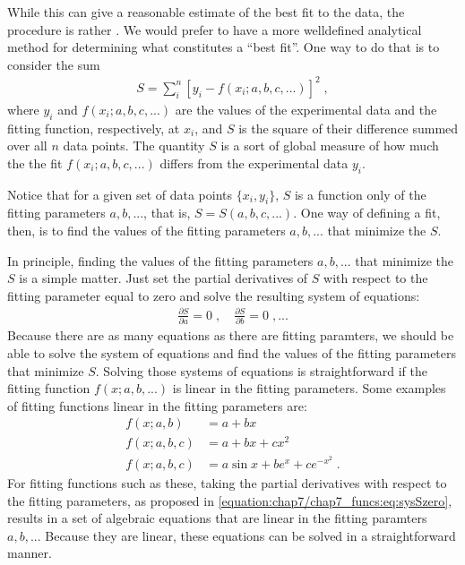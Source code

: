 \documentclass[letterpaper,10pt,english]{sphinxmanual}
\begin{document}
\sphinxAtStartPar
While this can give a reasonable estimate of the best fit to the data, the procedure is rather .  We would prefer to have a more well\sphinxhyphen{}defined analytical method for determining what constitutes a “best fit”.  One way to do that is to consider the sum
\begin{equation}\label{equation:chap7/chap7_funcs:eq:lsqrsum}
\begin{split}S = \sum_{i}^{n} [y_{i} - f(x_{i}; a, b, c, ...)]^2 \;,\end{split}
\end{equation}
\sphinxAtStartPar
where \(y_{i}\) and \(f(x_{i}; a, b, c, ...)\) are the values of the experimental data and the fitting function, respectively, at \(x_{i}\), and \(S\) is the square of their difference summed over all \(n\) data points.  The quantity \(S\) is a sort of global measure of how much the the fit \(f(x_{i}; a, b, c, ...)\) differs from the experimental data \(y_{i}\).

\sphinxAtStartPar
Notice that for a given set of data points \(\{x_i, y_i\}\), \(S\) is a function only of the fitting parameters \(a, b, ...\), that is, \(S=S(a, b, c, ...)\).  One way of defining a  fit, then, is to find the values of the fitting parameters \(a, b, ...\) that minimize the \(S\).

\sphinxAtStartPar
In principle, finding the values of the fitting parameters \(a, b, ...\) that minimize the \(S\) is a simple matter.  Just set the partial derivatives of \(S\) with respect to the fitting parameter equal to zero and solve the resulting system of equations:
\begin{equation}\label{equation:chap7/chap7_funcs:eq:sysSzero}
\begin{split}\frac{\partial S}{\partial a} = 0 \;, \quad
\frac{\partial S}{\partial b} = 0 \;, ...\end{split}
\end{equation}
\sphinxAtStartPar
Because there are as many equations as there are fitting paramters, we should be able to solve the system of equations and find the values of the fitting parameters that minimize \(S\).  Solving those systems of equations is straightforward if the fitting function \(f(x; a, b, ...)\) is linear in the fitting parameters.  Some examples of fitting functions linear in the fitting parameters are:
\begin{equation}\label{equation:chap7/chap7_funcs:eq:fitfuncs}
\begin{split}f(x; a, b) &= a + bx \\
f(x; a, b, c) &= a + bx + cx^2 \\
f(x; a, b, c) &= a \sin x + b e^x + c e^{-x^2} \;.\end{split}
\end{equation}
\sphinxAtStartPar
For fitting functions such as these, taking the partial derivatives with respect to the fitting parameters, as proposed in \eqref{equation:chap7/chap7_funcs:eq:sysSzero}, results in a set of algebraic equations that are linear in the fitting paramters \(a, b, ...\) Because they are linear, these equations can be solved in a straightforward manner.
\end{document}
